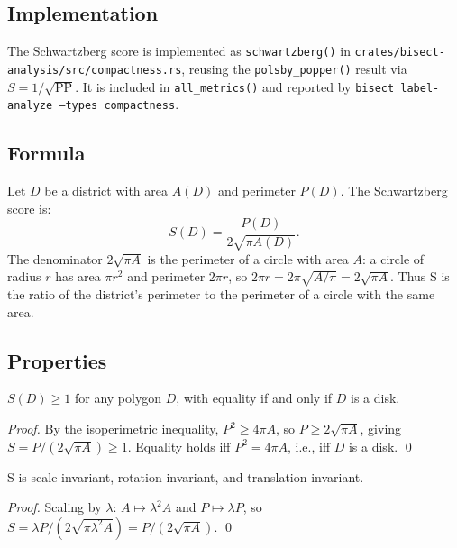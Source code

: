 \subsection{Implementation}

The Schwartzberg score is implemented as \texttt{schwartzberg()} in
\texttt{crates/bisect-analysis/src/compactness.rs}, reusing the
\texttt{polsby\_popper()} result via $S = 1/\sqrt{\mathrm{PP}}$.
It is included in \texttt{all\_metrics()} and reported by
\texttt{bisect label-analyze --types compactness}.

\subsection{Formula}

Let $D$ be a district with area $A(D)$ and perimeter $P(D)$.
The Schwartzberg score is:
\begin{equation}
  S(D) = \frac{P(D)}{2\sqrt{\pi A(D)}}.
  \label{eq:schwartzberg}
\end{equation}
The denominator $2\sqrt{\pi A}$ is the perimeter of a circle with area $A$:
a circle of radius $r$ has area $\pi r^2$ and perimeter $2\pi r$,
so $2\pi r = 2\pi \sqrt{A/\pi} = 2\sqrt{\pi A}$.
Thus S is the ratio of the district's perimeter to the perimeter of a circle
with the same area.

\subsection{Properties}

\begin{proposition}
  $S(D) \geq 1$ for any polygon $D$, with equality if and only if $D$ is a disk.
\end{proposition}

\begin{proof}
  By the isoperimetric inequality, $P^2 \geq 4\pi A$, so $P \geq 2\sqrt{\pi A}$,
  giving $S = P/(2\sqrt{\pi A}) \geq 1$.
  Equality holds iff $P^2 = 4\pi A$, i.e., iff $D$ is a disk. \qed
\end{proof}

\begin{proposition}
  S is scale-invariant, rotation-invariant, and translation-invariant.
\end{proposition}

\begin{proof}
  Scaling by $\lambda$: $A \mapsto \lambda^2 A$ and $P \mapsto \lambda P$,
  so $S = \lambda P / (2\sqrt{\pi \lambda^2 A}) = P/(2\sqrt{\pi A})$. \qed
\end{proof}

